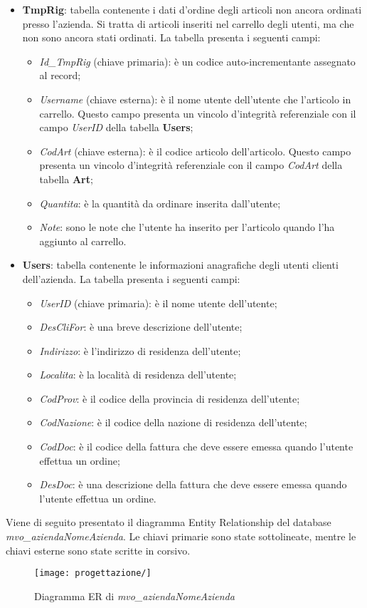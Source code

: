 \begin{itemize}
	\item \textbf{TmpRig}: tabella contenente i dati d'ordine degli articoli non ancora ordinati presso l'azienda. Si tratta di articoli inseriti nel carrello degli utenti, ma che non sono ancora stati ordinati. La tabella presenta i seguenti campi:
		\begin{itemize}
			\item \textit{Id\_TmpRig} (chiave primaria): è un codice auto-incrementante assegnato al record;
			\item \textit{Username} (chiave esterna): è il nome utente dell'utente che l'articolo in carrello. Questo campo presenta un vincolo d'integrità referenziale con il campo \textit{UserID} della tabella \textbf{Users};
			\item \textit{CodArt} (chiave esterna): è il codice articolo dell'articolo. Questo campo presenta un vincolo d'integrità referenziale con il campo \textit{CodArt} della tabella \textbf{Art};
			\item \textit{Quantita}: è la quantità da ordinare inserita dall'utente;
			\item \textit{Note}: sono le note che l'utente ha inserito per l'articolo quando l'ha aggiunto al carrello.
		\end{itemize}
	\item \textbf{Users}: tabella contenente le informazioni anagrafiche degli utenti clienti dell'azienda. La tabella presenta i seguenti campi:
		\begin{itemize}
			\item \textit{UserID} (chiave primaria): è il nome utente dell'utente;
			\item \textit{DesCliFor}: è una breve descrizione dell'utente;
			\item \textit{Indirizzo}: è l'indirizzo di residenza dell'utente;
			\item \textit{Localita}: è la località di residenza dell'utente;
			\item \textit{CodProv}: è il codice della provincia di residenza dell'utente;
			\item \textit{CodNazione}: è il codice della nazione di residenza dell'utente;
			\item \textit{CodDoc}: è il codice della fattura che deve essere emessa quando l'utente effettua un ordine;
			\item \textit{DesDoc}: è una descrizione della fattura che deve essere emessa quando l'utente effettua un ordine.
		\end{itemize}
\end{itemize}
Viene di seguito presentato il diagramma Entity Relationship del database \textit{mvo\_aziendaNomeAzienda}. Le chiavi primarie sono state sottolineate, mentre le chiavi esterne sono state scritte in corsivo.

\begin{figure}[!h] 
    \centering 
    \texttt{[image: progettazione/]} 
    \caption{Diagramma ER di \textit{mvo\_aziendaNomeAzienda}}
\end{figure}

